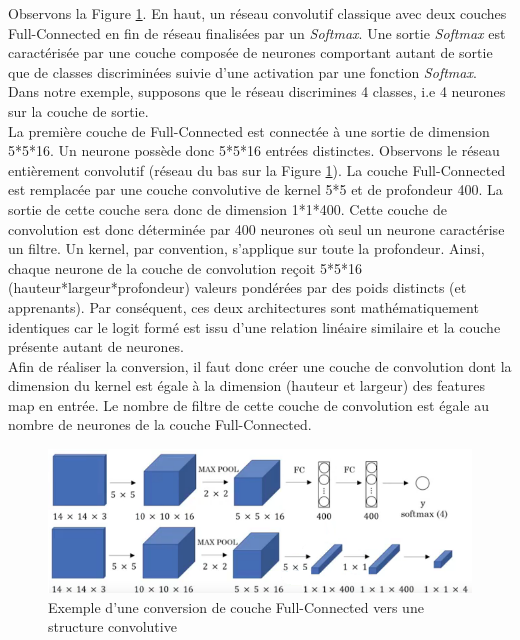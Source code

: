 \noindent Observons la Figure \ref{fulltoconv}. En haut, un réseau convolutif classique avec deux couches Full-Connected en fin de réseau finalisées par un \textit{Softmax}. Une sortie \textit{Softmax} est caractérisée par une couche composée de neurones comportant autant de sortie que de classes discriminées suivie d'une activation par une fonction \textit{Softmax}. Dans notre exemple, supposons que le réseau discrimines 4 classes, i.e 4 neurones sur la couche de sortie.\\

\noindent La première couche de Full-Connected est connectée à une sortie de dimension 5*5*16. Un neurone possède donc 5*5*16 entrées distinctes. Observons le réseau entièrement convolutif (réseau du bas sur la Figure \ref{fulltoconv}). La couche Full-Connected est remplacée par une couche convolutive de kernel 5*5 et de profondeur 400. La sortie de cette couche sera donc de dimension 1*1*400. Cette couche de convolution est donc déterminée par 400 neurones où seul un neurone caractérise un filtre. Un kernel, par convention, s'applique sur toute la profondeur. Ainsi, chaque neurone de la couche de convolution reçoit 5*5*16 (hauteur*largeur*profondeur) valeurs pondérées par des poids distincts (et apprenants). Par conséquent, ces deux architectures sont mathématiquement identiques car le logit formé est issu d'une relation linéaire similaire et la couche présente autant de neurones.\\

\noindent Afin de réaliser la conversion, il faut donc créer une couche de convolution dont la dimension du kernel est égale à la dimension (hauteur et largeur) des features map en entrée. Le nombre de filtre de cette couche de convolution est égale au nombre de neurones de la couche Full-Connected.

\begin{figure}
    \centering
    \includegraphics[scale=0.4]{./tex/convolution-network/cnn/fctoconv1.png}
    \caption{Exemple d'une conversion de couche Full-Connected vers une structure convolutive}
    \label{fulltoconv}
\end{figure}

